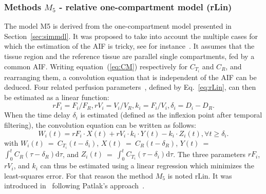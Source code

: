 \subsubsection{Methods $M_5$ - relative one-compartment model (rLin)}
The model M5 is derived from the one-compartment model presented in Section~\ref{sec:simmdl}. It was proposed to take into account the multiple cases for which the estimation of the AIF is tricky, see for instance~\cite{Doury:2017fz}.
It assumes that the tissue region and the reference tissue are parallel single compartments, fed by a common AIF. 
Writing equation~(\ref{eq:CM}) respectively for $C_{T_i}$ and $C_R$, and rearranging them, a convolution equation that is independent of the AIF can be deduced. Four related perfusion parameters~\cite{Doury:2017fz}, defined by Eq.~\ref{eq:rLin}, can then be estimated as a linear function:
\begin{equation}
rF_i = F_i/F_R, rV_i = V_i/V_R, k_i = F_i/V_i, \delta_i = D_i - D_R.
\label{eq:rLin}
\end{equation}
When the time delay $\delta_i$ is estimated (defined as the inflexion point after temporal filtering), the convolution equation can be written as follows:
\begin{equation}
W_i(t)= rF_i \cdot X(t) + rV_i \cdot k_i \cdot Y(t) - k_i \cdot Z_i(t), \forall t \geq \delta_i.
\label{eq:rLin2}
\end{equation} 
 with $W_i(t)$~=~$C_{T_i}(t-\delta_i)$, $X(t)$~=~$C_R(t-\delta_R)$, $Y(t)$~=~$\int_0^t C_R \left(\tau-\delta_R\right)\mathrm d\tau$,
and $Z_i(t)$~=~$\int_0^t C_{T_i} \left(\tau-\delta_i \right)\mathrm d\tau$.
The three parameters $rF_i$, $rV_i$, and $k_i$ can thus be estimated using a linear regression which minimizes the least-squares error. For that reason the method $M_5$ is noted rLin. It was introduced in~\cite{Doury:2016fi} following Patlak's approach~\cite{Patlak:1983id}.

